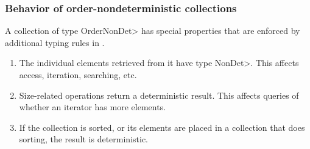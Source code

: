 \subsubsection{Behavior of order-nondeterministic collections}\label{sec:ond-behavior}
A collection of type \<OrderNonDet> has special properties that are enforced by additional typing rules in \ourTypeSystem.

\begin{enumerate}
    \item
    The individual elements retrieved from it have type \<NonDet>.  This
    affects access, iteration, searching, etc.
    \item
    Size-related operations return a deterministic result.  This affects
    queries of whether an iterator has more elements.
    \item
    If the collection is sorted, or its elements are placed in a collection
    that does sorting, the result is deterministic.
\end{enumerate}

